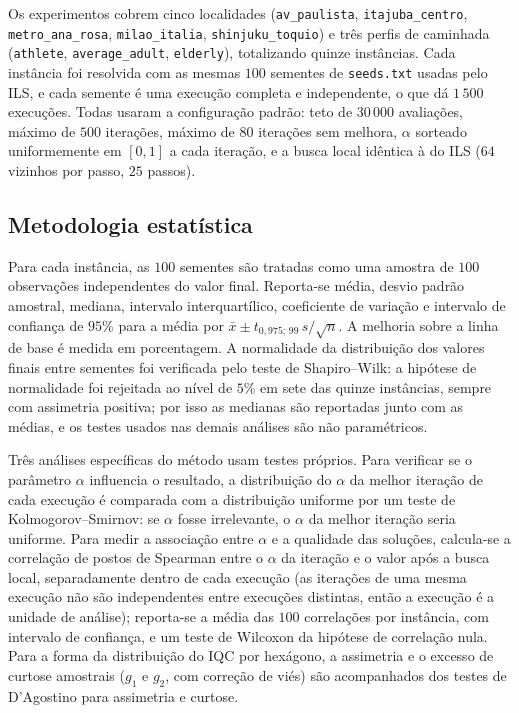 \documentclass[11pt,a4paper]{article}
\newcommand{\code}[1]{\texttt{#1}}
\begin{document}
Os experimentos cobrem cinco localidades (\code{av\_paulista}, \code{itajuba\_centro}, \code{metro\_ana\_rosa}, \code{milao\_italia}, \code{shinjuku\_toquio}) e três perfis de caminhada (\code{athlete}, \code{average\_adult}, \code{elderly}), totalizando quinze instâncias. Cada instância foi resolvida com as mesmas $100$ sementes de \code{seeds.txt} usadas pelo ILS, e cada semente é uma execução completa e independente, o que dá $1\,500$ execuções. Todas usaram a configuração padrão: teto de $30\,000$ avaliações, máximo de $500$ iterações, máximo de $80$ iterações sem melhora, $\alpha$ sorteado uniformemente em $[0,1]$ a cada iteração, e a busca local idêntica à do ILS ($64$ vizinhos por passo, $25$ passos).

\subsection{Metodologia estatística}

Para cada instância, as $100$ sementes são tratadas como uma amostra de $100$ observações independentes do valor final. Reporta-se média, desvio padrão amostral, mediana, intervalo interquartílico, coeficiente de variação e intervalo de confiança de $95\%$ para a média por $\bar{x} \pm t_{0{,}975;\,99}\, s/\sqrt{n}$. A melhoria sobre a linha de base é medida em porcentagem. A normalidade da distribuição dos valores finais entre sementes foi verificada pelo teste de Shapiro--Wilk: a hipótese de normalidade foi rejeitada ao nível de $5\%$ em sete das quinze instâncias, sempre com assimetria positiva; por isso as medianas são reportadas junto com as médias, e os testes usados nas demais análises são não paramétricos.

Três análises específicas do método usam testes próprios. Para verificar se o parâmetro $\alpha$ influencia o resultado, a distribuição do $\alpha$ da melhor iteração de cada execução é comparada com a distribuição uniforme por um teste de Kolmogorov--Smirnov: se $\alpha$ fosse irrelevante, o $\alpha$ da melhor iteração seria uniforme. Para medir a associação entre $\alpha$ e a qualidade das soluções, calcula-se a correlação de postos de Spearman entre o $\alpha$ da iteração e o valor após a busca local, separadamente dentro de cada execução (as iterações de uma mesma execução não são independentes entre execuções distintas, então a execução é a unidade de análise); reporta-se a média das $100$ correlações por instância, com intervalo de confiança, e um teste de Wilcoxon da hipótese de correlação nula. Para a forma da distribuição do IQC por hexágono, a assimetria e o excesso de curtose amostrais ($g_1$ e $g_2$, com correção de viés) são acompanhados dos testes de D'Agostino para assimetria e curtose.
\end{document}
